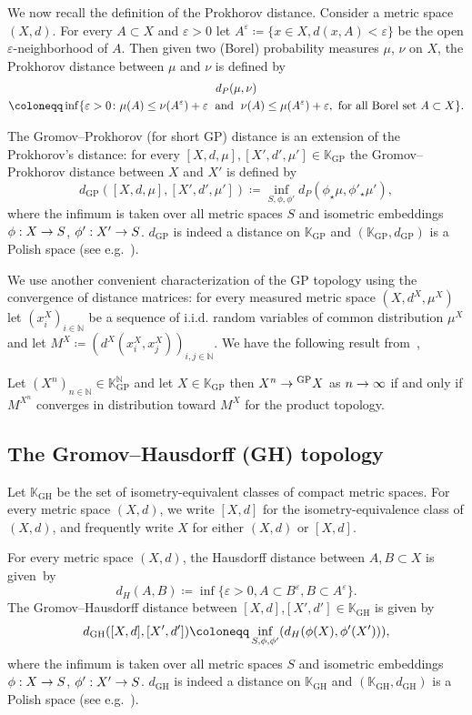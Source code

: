 \documentclass[AHL,Unicode,published]{cedram}
\newcommand{\e}{\varepsilon}
\DeclareMathOperator{\GH}{GH}
\DeclareMathOperator{\GP}{GP}
\newcommand{\K}{\mathbb{K}}
\newcommand{\N}{\mathbb{N}}
\newcommand{\1}{\mathbbm{1}}
\let\originalleft\left
\let\originalright\right
\renewcommand{\left}{\mathopen{}\mathclose\bgroup\originalleft}
\renewcommand{\right}{\aftergroup\egroup\originalright}
\renewcommand*{\to}{\mathchoice{\longrightarrow}{\rightarrow}{\rightarrow}{\rightarrow}}
\begin{document}
We now recall the definition of the Prokhorov distance. Consider a metric space $(X,d)$. For every $A\subset X$ and $\e>0$ let $A^\e\coloneqq \{x\in X, d(x,A)<\e\}$ be the open $\varepsilon$-neighborhood of $A$. Then given two (Borel) probability measures $\mu$, $\nu$ on $X$, the Prokhorov distance between $\mu$ and $\nu$ is defined by
\begin{multline*}
d_P(\mu, \nu)\\
\coloneqq \inf\left\{ \e>0\colon \mu(A)\leq \nu (A^\e)+\e\;\text{ and }\;\nu(A)\leq \mu(A^\e)+\e, \text{ for all Borel set }A\subset X \right\}.
\end{multline*}

The Gromov--Prokhorov (for short GP) distance is an extension of the Prokhorov's distance: for every $[X,d,\mu],[X',d',\mu']\in \K_{\GP}$ the Gromov--Prokhorov distance between $X$ and $X'$ is defined by
\[
d_{\GP}([X,d,\mu],[X',d',\mu'])\coloneqq\inf_{S,\phi,\phi'} d_P(\phi_\star \mu, \phi'_\star\mu'),
\]
where the infimum is taken over all metric spaces $S$ and isometric embeddings $\phi :X\to S$, $\phi' :X'\to S$. $d_{\GP}$ is indeed a distance on $\K_{\GP}$ and $(\K_{\GP},d_{\GP})$ is a Polish space (see e.g.~\cite{ADH13}).

We use another convenient characterization of the GP topology using the convergence of distance matrices: for every measured metric space $(X,d^X,\mu^X)$ let $(x_i^X)_{i\in \N}$ be a sequence of i.i.d. random variables of common distribution $\mu^X$ and let $M^X\coloneqq(d^X(x_i^X,x_j^X))_{i,j\in \N}$. We have the following result from~\cite{Loh13},

\begin{lemm}\label{equivGP}
Let $(X^n)_{n\in \N} \in \K_{\GP}^\N$ and let $X\in \K_{\GP}$ then $X^n\to^{\GP}X$ as $n\to \infty$ if and only if $M^{X^n}$ converges in distribution toward $M^X$ for the product topology.
\end{lemm}

\subsection{The Gromov--Hausdorff (GH) topology} \label{GH}
Let $\K_{\GH}$ be the set of isometry-equivalent classes of compact metric spaces. For every metric space $(X,d)$, we write $[X,d]$ for the isometry-equivalence class of $(X,d)$, and frequently write $X$ for either $(X,d)$ or $[X,d]$.

For every metric space $(X,d)$, the Hausdorff distance between $A,B\subset X$ is given~by
\[
d_H(A,B)\coloneqq \inf\{\e>0, A\subset B^\e, B\subset A^\e \}.
\]
The Gromov--Hausdorff distance between $[X,d]$,$[X',d']\in \K_{\GH}$ is given by
\[
d_{\GH}([X,d],[X',d'])\coloneqq\inf_{S,\phi,\phi'} \left (d_H(\phi(X), \phi'(X')) \right),
\]
where the infimum is taken over all metric spaces $S$ and isometric embeddings $\phi :X\to S$, $\phi' :X'\to S$. $d_{\GH}$ is indeed a distance on $\K_{\GH}$ and $(\K_{\GH},d_{\GH})$ is a Polish space (see e.g.~\cite{ADH13}).
\end{document}
